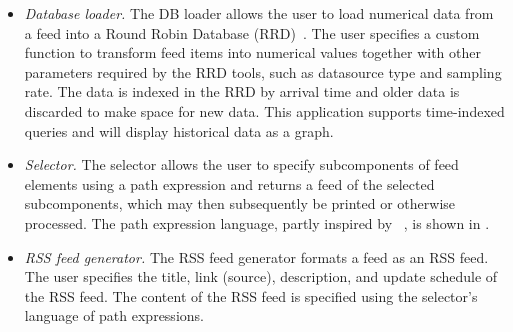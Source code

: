 \begin{itemize}
\item {\em Database loader.} The DB loader allows the user to load numerical
data from a feed into a Round Robin Database (RRD)~\cite{rrdtool}. The user specifies
a custom function to transform feed items into numerical values together with other parameters required by the RRD tools, such as datasource
type and sampling rate. The data is indexed in the RRD by arrival time and
older data is discarded to make space for new data.  This application supports
time-indexed queries and will display historical data as a graph.

\item {\em Selector.} The selector allows the user to specify subcomponents of feed elements 
using a path expression and returns a feed of the selected subcomponents, which may then
subsequently be printed or otherwise processed. The path expression 
language, partly inspired by \xpath{}~\cite{xpath}, is shown in .

\item {\em RSS feed generator.} The RSS feed generator formats a
\padsd{} feed as an RSS feed. The user specifies
the title, link (source), description, and update schedule of the RSS feed.
The content of the RSS feed is specified using the selector's language of path 
expressions. 
\end{itemize}



